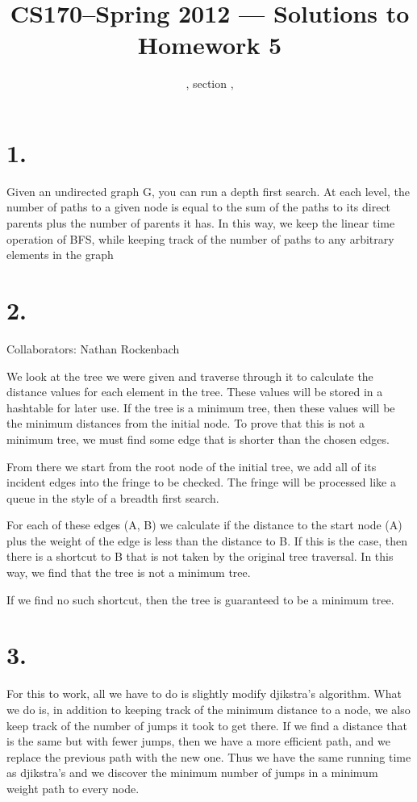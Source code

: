 \documentclass[11pt]{article}
\title{CS170--Spring 2012 --- Solutions to Homework 5}
\author{\Name, section \Sec, \texttt{\Login}}
\begin{document}
\maketitle

\section*{1.}
Given an undirected graph G, you can run a depth first search. At each level,
the number of paths to a given node is equal to the sum of the paths to its
direct parents plus the number of parents it has. In this way, we keep the
linear time operation of BFS, while keeping track of the number of paths to any
arbitrary elements in the graph

\newpage
\section*{2.}
Collaborators: Nathan Rockenbach

We look at the tree we were given and traverse through it to calculate the
distance values for each element in the tree. These values will be stored in a
hashtable for later use. If the tree is a minimum tree, then these values will
be the minimum distances from the initial node. To prove that this is not a
minimum tree, we must find some edge that is shorter than the chosen edges. 

From there we start from the root node of the initial tree, we add all of its
incident edges into the fringe to be checked. The fringe will be processed like
a queue in the style of a breadth first search. 

For each of these edges (A, B) we calculate if the distance to the start node
(A) plus the weight of the edge is less than the distance to B. If this is the
case, then there is a shortcut to B that is not taken by the original tree
traversal. In this way, we find that the tree is not a minimum tree. 

If we find no such shortcut, then the tree is guaranteed to be a minimum tree. 

\newpage
\section*{3.}
For this to work, all we have to do is slightly modify djikstra's algorithm.
What we do is, in addition to keeping track of the minimum distance to a node,
we also keep track of the number of jumps it took to get there. If we find a
distance that is the same but with fewer jumps, then we have a more efficient
path, and we replace the previous path with the new one. Thus we have the same
running time as djikstra's and we discover the minimum number of jumps in a
minimum weight path to every node. 
\newpage
\end{document}
